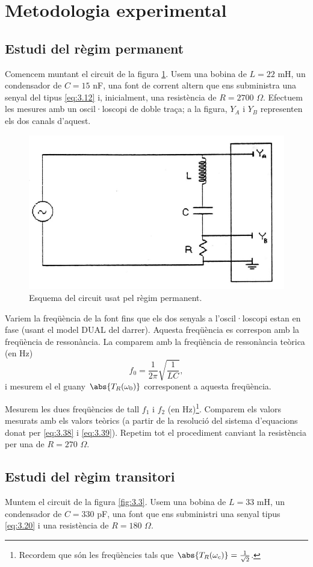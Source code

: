 \documentclass[a4paper,10.5pt]{report}
\begin{document}
\section{Metodologia experimental}

\subsection{Estudi del règim permanent}

Comencem muntant el circuit de la figura \ref{fig:3.2}. Usem una bobina de $L = 22$ mH, un condensador de $C = 15$ nF, una font de corrent altern que ens subministra una senyal del tipus \eqref{eq:3.12}  i, inicialment, una resistència de $R = 2700$ $\Omega$. Efectuem les mesures amb un oscil·loscopi de doble traça; a la figura, $Y_A$ i $Y_B$ representen els dos canals d'aquest.

\begin{figure}[h]
	\centering
	\includegraphics[width=0.5\linewidth]{screenshot005}
	\caption{Esquema del circuit usat pel règim permanent.}
	\label{fig:3.2}
\end{figure}

Variem la freqüència de la font fins que els dos senyals a l'oscil·loscopi estan en fase (usant el model DUAL del darrer). Aquesta freqüència es correspon amb la freqüència de ressonància. La comparem amb la freqüència de ressonància teòrica (en Hz)
\begin{equation}
	f_0 = \frac{1}{2\pi}\sqrt{\frac{1}{LC}},
\end{equation}
i mesurem el el guany $\abs{T_R(\omega_0)}$ corresponent a aquesta freqüència.

Mesurem les dues freqüències de tall $f_1$ i $f_2$ (en Hz)\footnote{Recordem que són les freqüències tals que $\abs{T_R(\omega_c)} = \frac{1}{\sqrt{2}}$.}. Comparem els valors mesurats amb els valors teòrics (a partir de la resolució del sistema d'equacions donat per \eqref{eq:3.38} i \eqref{eq:3.39}). Repetim tot el procediment canviant la resistència per una de $R = 270$ $\Omega$.

\subsection{Estudi del règim transitori}
Muntem el circuit de la figura \ref{fig:3.3}. Usem una bobina de $L = 33$ mH, un condensador de $C = 330$ pF, una font que ens subministri una senyal tipus \eqref{eq:3.20} i una resistència de $R = 180$ $\Omega$.
\end{document}
